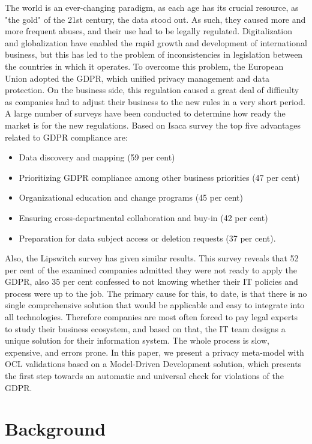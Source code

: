 \documentclass[11pt,english]{article}
\begin{document}
The world is an ever-changing paradigm, as each age has its crucial resource, as "the gold" of the 21st century, the data stood out. As such, they caused more and more frequent abuses, and their use had to be legally regulated. Digitalization and globalization have enabled the rapid growth and development of international business, but this has led to the problem of inconsistencies in legislation between the countries in which it operates. To overcome this problem, the European Union adopted the GDPR, which unified privacy management and data protection. On the business side, this regulation caused a great deal of difficulty as companies had to adjust their business to the new rules in a very short period. A large number of surveys have been conducted to determine how ready the market is for the new regulations. Based on Isaca survey \cite{isaca} the top five advantages related to GDPR compliance are:
\begin{itemize}
  \item Data discovery and mapping (59 per cent)
  \item Prioritizing GDPR compliance among other business priorities (47 per cent)
  \item Organizational education and change programs (45 per cent)
  \item Ensuring cross-departmental collaboration and buy-in (42 per cent)
  \item Preparation for data subject access or deletion requests (37 per cent).
\end{itemize}
Also, the Lipswitch survey\cite{lipswitch} has given similar results. This survey reveals that 52 per cent of the examined companies admitted they were not ready to apply the GDPR, also 35 per cent confessed to not knowing whether their IT policies and process were up to the job. The primary cause for this, to date, is that there is no single comprehensive solution that would be applicable and easy to integrate into all technologies. Therefore companies are most often forced to pay legal experts to study their business ecosystem, and based on that, the IT team designs a unique solution for their information system. The whole process is slow, expensive, and errors prone.
In this paper, we present a privacy meta-model with OCL validations\cite{ocl} based on a Model-Driven Development solution, which presents the first step towards an automatic and universal check for violations of the GDPR.

\section{Background}

\printbibliography
\end{document}
